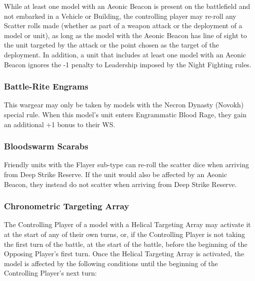 While at least one model with an Aeonic Beacon is present on the battlefield and not embarked in a Vehicle or Building, the controlling player may re-roll any Scatter rolls made (whether as part of a weapon attack or the deployment of a model or unit), as long as the model with the Aeonic Beacon has line of sight to the unit targeted by the attack or the point chosen as the target of the deployment. In addition, a unit that includes at least one model with an Aeonic Beacon ignores the -1 penalty to Leadership imposed by the Night Fighting rules.

\subsubsection{Battle-Rite Engrams} \label{Battle-Rite Engrams}

This wargear may only be taken by models with the Necron Dynasty (Novokh) special rule. When this model's unit enters Engrammatic Blood Rage, they gain an additional +1 bonus to their WS.

\subsubsection{Bloodswarm Scarabs} \label{Bloodswarm Scarabs}

Friendly units with the Flayer sub-type can re-roll the scatter dice when arriving from Deep Strike Reserve. If the unit would also be affected by an Aeonic Beacon, they instead do not scatter when arriving from Deep Strike Reserve.

\subsubsection{Chronometric Targeting Array} \label{Chronometric Targeting Array}

The Controlling Player of a model with a Helical Targeting Array may activate it at the start of any of their own turns, or, if the Controlling Player is not taking the first turn of the battle, at the start of the battle, before the beginning of the Opposing Player’s first turn. Once the Helical Targeting Array is activated, the model is affected by the following conditions until the beginning of the Controlling Player’s next turn:

